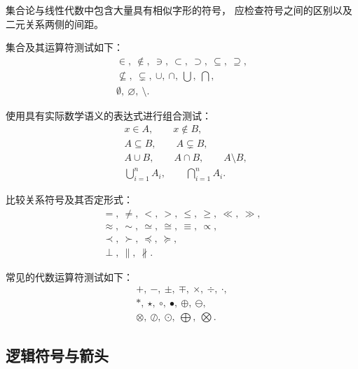 集合论与线性代数中包含大量具有相似字形的符号，
应检查符号之间的区别以及二元关系两侧的间距。

集合及其运算符测试如下：
\begin{equation}
  \label{eq:test-symbol-set}
  \begin{gathered}
    \in,\ \notin,\ \ni,\ \subset,\ \supset,\ 
    \subseteq,\ \supseteq,\\
    \nsubseteq,\ \subsetneq,\ \cup,\ \cap,\ 
    \bigcup,\ \bigcap,\\
    \emptyset,\ \varnothing,\ \setminus.
  \end{gathered}
\end{equation}

使用具有实际数学语义的表达式进行组合测试：
\begin{equation}
  \label{eq:test-symbol-set-expression}
  \begin{aligned}
    &x\in A,\qquad x\notin B,\\
    &A\subseteq B,\qquad A\subsetneq B,\\
    &A\cup B,\qquad A\cap B,\qquad A\setminus B,\\
    &\bigcup_{i=1}^{n}A_i,\qquad
     \bigcap_{i=1}^{n}A_i.
  \end{aligned}
\end{equation}

比较关系符号及其否定形式：
\begin{equation}
  \label{eq:test-symbol-relations}
  \begin{gathered}
    =,\ \neq,\ <,\ >,\ \le,\ \ge,\ \ll,\ \gg,\\
    \approx,\ \sim,\ \simeq,\ \cong,\ \equiv,\ \propto,\\
    \prec,\ \succ,\ \preceq,\ \succeq,\\
    \perp,\ \parallel,\ \nparallel.
  \end{gathered}
\end{equation}

常见的代数运算符测试如下：
\begin{equation}
  \label{eq:test-symbol-binary}
  \begin{gathered}
    +,\ -,\ \pm,\ \mp,\ \times,\ \div,\ \cdot,\\
    \ast,\ \star,\ \circ,\ \bullet,\ \oplus,\ \ominus,\\
    \otimes,\ \oslash,\ \odot,\ \bigoplus,\ \bigotimes.
  \end{gathered}
\end{equation}

\subsection{逻辑符号与箭头}
\label{subsec:symbol-logic}

